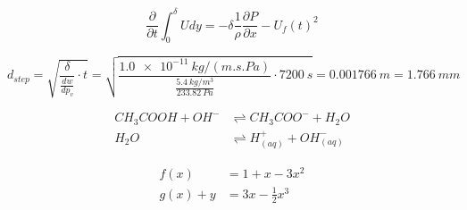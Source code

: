 \begin{equation} \label{eq:IME}
    \frac{\partial}{\partial t} \int_{0}^{\delta} U dy = - \delta \frac{1}{\rho}\frac{\partial P}{\partial x}-U_f(t)^2
\end{equation}

\begin{equation} \label{eq:penDepthStep}
d_{step} = \sqrt{\frac{\delta}{\frac{dw}{dp_v}} \cdot t} =
\sqrt{\frac{\SI{1.0e-11}{kg/(m.s.Pa)}}{\frac{\SI{5.4}{kg/m^3}}{\SI{233.82}{Pa}}} \cdot \SI{7200}{s}} =
\SI{0.001766}{m} = \SI{1.766}{mm}
\end{equation}

\begin{equation} \label{eq:equilibrium}
\begin{aligned}
    CH_3COOH + OH^{-} &\rightleftharpoons CH_3COO^{-} + H_2O \\
    H_2O &\rightleftharpoons H^{+}_{(aq)} + OH^{-}_{(aq)}
\end{aligned}
\end{equation}


\begin{align}
    \label{eq:align1}
    f(x) &= 1 + x - 3 x^2 \\
    \label{eq:align2}
    g(x) + y &= 3x - \frac{1}{2} x^3
\end{align}
